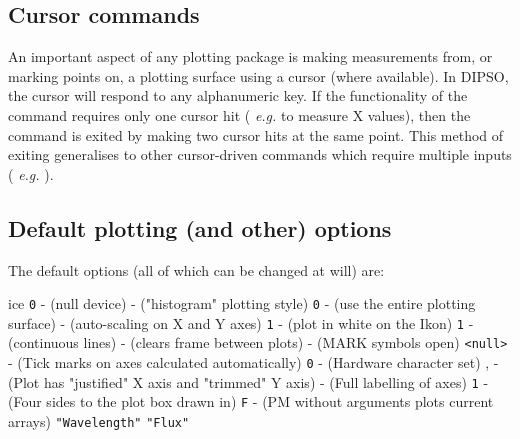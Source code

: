 \subsection {Cursor commands}

An important aspect of any plotting package is making measurements
from, or marking points on, a plotting surface using a cursor (where
available). In DIPSO, the cursor will respond to any alphanumeric key.
If the functionality of the command requires only one cursor hit ({\em
e.g.}   to measure X values), then the command is exited by making
two cursor hits at the same point. This method of exiting generalises
to other cursor-driven commands which require multiple inputs ({\em
e.g.} ). 

\subsection {Default plotting (and other) options}

The default options (all of which can be changed at will) are:

ice  {\tt{0}}  - (null device) \newline
{}  - ("histogram" plotting style) \newline
{}  {\tt{0}}  - (use the entire plotting surface) \newline
{}  - (auto-scaling on X and Y axes) \newline
{}  {\tt{1}}  - (plot in white on the Ikon) \newline
{}  {\tt{1}}  - (continuous lines) \newline
{}  - (clears frame between plots) \newline
{}  - (MARK symbols open) \newline
{}  {\tt{<null>}}  - (Tick marks on axes calculated automatically) \newline
{}  {\tt{0}}  - (Hardware character set) \newline
{},    - (Plot has "justified" X axis and "trimmed" Y axis) \newline
{}  - (Full labelling of axes) \newline
{}  {\tt{1}}  - (Four sides to the plot box drawn in) \newline
{}  {\tt{F}}  - (PM without arguments plots current arrays) \newline
{}  {\tt{"Wavelength"}}  \newline
{}  {\tt{"Flux"}}  \newline

